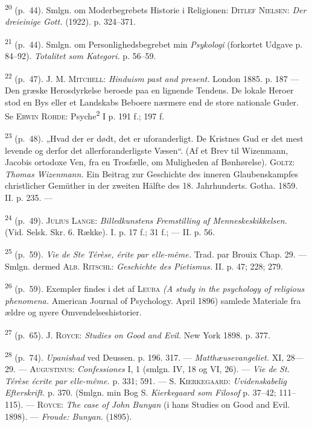 \documentclass[12pt,a4paper,openany]{book}
\newcommand{\opage}[1]{\marginnote{\footnotesize\textit{[#1]}}}
\begin{document}
\begin{small}
\textsuperscript{20} (p.~44). Smlgn. om Moderbegrebets Historie i
Religionen: \textsc{Ditlef Nielsen}:
\textit{Der dreieinige Gott.} (1922). p. 324--371.

\textsuperscript{21} (p.~44). Smlgn. om Personlighedsbegrebet min
\textit{Psykologi} (forkortet Udgave
p. 84--92). \textit{Totalitet som Kategori.} p. 56--59.

\textsuperscript{22} (p.~47). J. M. \textsc{Mitchell}: \textit{Hinduism
past and present.} London
1885. p. 187 --- Den græske Herosdyrkelse beroede paa en lignende
Tendens. De lokale Heroer stod en Bys eller et Landskabs Beboere nærmere
end de store nationale Guder. Se \textsc{Erwin Rohde}:
Psyche\textsuperscript{2} I p. 191 f.; 197 f.

\textsuperscript{23} (p.~48). „Hvad der er dødt, det er uforanderligt.
De Kristnes Gud er det mest
levende og derfor det allerforanderligste Væsen“. (Af et Brev til
Wizenmann, Jacobis ortodoxe Ven, fra en Trosfælle, om Muligheden af
\opage{248}Bønhørelse). \textsc{Goltz}: \textit{Thomas Wizenmann.} Ein
Beitrag zur Geschichte des inneren Glaubenskampfes christlicher Gemüther
in der zweiten Hälfte des 18. Jahrhunderts. Gotha. 1859. II. p. 235. ---

\textsuperscript{24} (p.~49). \textsc{Julius Lange}:
\textit{Billedkunstens Fremstilling af
Menneskeskikkelsen.} (Vid. Selsk. Skr. 6. Række). I. p. 17 f.; 31 f.;
--- II. p. 56.

\textsuperscript{25} (p.~59). \textit{Vie de Ste Térèse, érite par
elle-même.} Trad. par Brouix Chap.
29. --- Smlgn. dermed \textsc{Alb. Ritschl}: \textit{Geschichte des
Pietismus.} II. p. 47; 228; 279.

\textsuperscript{26} (p.~59). Exempler findes i det af \textsc{Leuba}
\textit{(A study in the
psychology of religious phenomena.} American Journal of Psychology.
April 1896) samlede Materiale fra ældre og nyere Omvendelseshistorier.

\textsuperscript{27} (p.~65). J. \textsc{Royce}: \textit{Studies on Good
and Evil.} New York
1898. p. 377.

\textsuperscript{28} (p.~74). \textit{Upanishad} ved Deussen. p. 196.
317. ---
\textit{Matthæusevangeliet.} XI, 28---29. --- \textsc{Augustinus}:
\textit{Confessiones} I, 1 (smlgn. IV, 18 og VI, 26). --- \textit{Vie de
St. Térèse écrite par elle-même.} p. 331; 591. --- S.
\textsc{Kierkegaard}: \textit{Uvidenskabelig Efterskrift.} p. 370.
(Smlgn. min Bog S. \textit{Kierkegaard som Filosof} p. 37--42;
111--115). --- \textsc{Royce}: \textit{The case of John Bunyan} (i hans
Studies on Good and Evil. 1898). --- \textit{Froude: Bunyan.} (1895).


\end{small}
\end{document}
